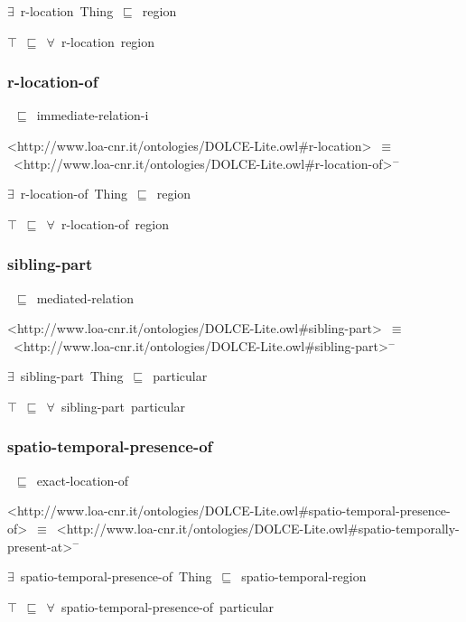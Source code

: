 \documentclass{article}
\begin{document}
\ensuremath{\exists}~r-location~Thing~\ensuremath{\sqsubseteq}~region

\ensuremath{\top}~\ensuremath{\sqsubseteq}~\ensuremath{\forall}~r-location~region

\subsubsection*{r-location-of}

~\ensuremath{\sqsubseteq}~immediate-relation-i

<http://www.loa-cnr.it/ontologies/DOLCE-Lite.owl#r-location>~\ensuremath{\equiv}~<http://www.loa-cnr.it/ontologies/DOLCE-Lite.owl#r-location-of>\ensuremath{^-}

\ensuremath{\exists}~r-location-of~Thing~\ensuremath{\sqsubseteq}~region

\ensuremath{\top}~\ensuremath{\sqsubseteq}~\ensuremath{\forall}~r-location-of~region

\subsubsection*{sibling-part}

~\ensuremath{\sqsubseteq}~mediated-relation

<http://www.loa-cnr.it/ontologies/DOLCE-Lite.owl#sibling-part>~\ensuremath{\equiv}~<http://www.loa-cnr.it/ontologies/DOLCE-Lite.owl#sibling-part>\ensuremath{^-}

\ensuremath{\exists}~sibling-part~Thing~\ensuremath{\sqsubseteq}~particular

\ensuremath{\top}~\ensuremath{\sqsubseteq}~\ensuremath{\forall}~sibling-part~particular

\subsubsection*{spatio-temporal-presence-of}

~\ensuremath{\sqsubseteq}~exact-location-of

<http://www.loa-cnr.it/ontologies/DOLCE-Lite.owl#spatio-temporal-presence-of>~\ensuremath{\equiv}~<http://www.loa-cnr.it/ontologies/DOLCE-Lite.owl#spatio-temporally-present-at>\ensuremath{^-}

\ensuremath{\exists}~spatio-temporal-presence-of~Thing~\ensuremath{\sqsubseteq}~spatio-temporal-region

\ensuremath{\top}~\ensuremath{\sqsubseteq}~\ensuremath{\forall}~spatio-temporal-presence-of~particular
\end{document}
